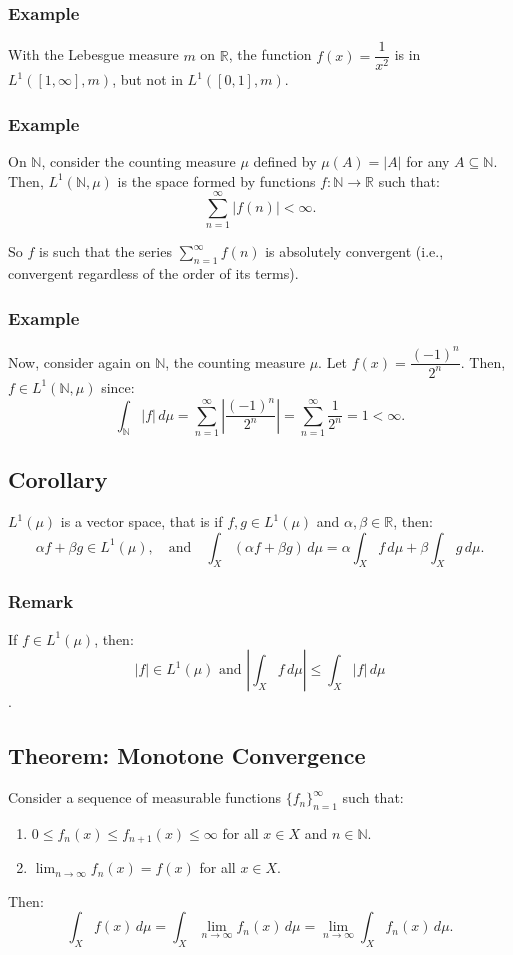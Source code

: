 \documentclass[11pt]{article}
\begin{document}
\subsubsection*{Example}
With the Lebesgue measure \(m\) on \(\mathbb{R}\), the function \(f(x) = \dfrac{1}{x^2}\) is in \(L^1([1, \infty], m)\), but not in \(L^1([0, 1], m)\).

\subsubsection*{Example}
On \(\mathbb{N}\), consider the counting measure \(\mu\) defined by \(\mu(A) = |A|\) for any \(A \subseteq \mathbb{N}\). Then, \(L^1(\mathbb{N}, \mu)\) is the space formed by functions \(f: \mathbb{N} \to \mathbb{R}\) such that:
\[\sum_{n=1}^{\infty} |f(n)| < \infty.\]

So \(f\) is such that the series \(\sum_{n=1}^{\infty} f(n)\) is absolutely convergent (i.e., convergent regardless of the order of its terms).

\subsubsection*{Example}
Now, consider again on \(\mathbb{N}\), the counting measure \(\mu\). Let \(f(x) = \dfrac{(-1)^n}{2^n}\). Then, \(f \in L^1(\mathbb{N}, \mu)\) since:
\[\int_{\mathbb{N}} |f| \,d\mu = \sum_{n=1}^{\infty} \left|\frac{(-1)^n}{2^n}\right| = \sum_{n=1}^{\infty} \frac{1}{2^n} = 1 < \infty.\]

\subsection{Corollary}
\(L^1(\mu)\) is a vector space, that is if \(f, g \in L^1(\mu)\) and \(\alpha, \beta \in \mathbb{R}\), then:
\[\alpha f + \beta g \in L^1(\mu), \quad \text{and} \quad \int_X (\alpha f + \beta g) \,d\mu = \alpha \int_X f \,d\mu + \beta \int_X g \,d\mu.\]

\subsubsection*{Remark}
If \(f \in L^1(\mu)\), then:
\[|f| \in L^1(\mu) \text{ and } \left|\int_X f \,d\mu\right| \leq \int_X |f| \,d\mu\].

\subsection{Theorem: Monotone Convergence}
Consider a sequence of measurable functions \(\{f_n\}_{n=1}^{\infty}\) such that:
\begin{enumerate}
    \item \(0 \leq f_n(x) \leq f_{n+1}(x) \leq \infty\) for all \(x \in X\) and \(n \in \mathbb{N}\).
    \item \(\lim_{n \to \infty} f_n(x) = f(x)\) for all \(x \in X\).
\end{enumerate}
Then:
\[\int_X f(x) \,d\mu = \int_X \lim_{n \to \infty} f_n(x) \,d\mu = \lim_{n \to \infty} \int_X f_n(x) \,d\mu.\]
\end{document}
